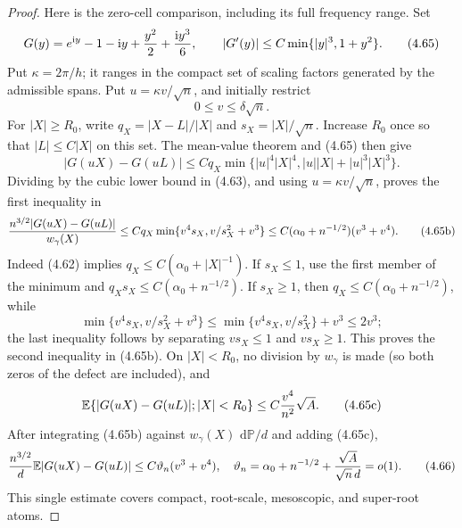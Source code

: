 \documentclass[11pt,a4paper]{article}
\numberwithin{equation}{section}
\theoremstyle{definition}
\theoremstyle{remark}
\newcommand{\E}{\mathbb E}
\newcommand{\Pp}{\mathbb P}
\newcommand{\ii}{\mathrm i}
\newcommand{\dd}{\,\mathrm d}
\begin{document}
\begin{proof}
Here is the zero-cell comparison, including its full frequency range.
Set
\[
 G(y)=e^{\ii y}-1-\ii y+{y^2\over2}+{\ii y^3\over6},
 \qquad |G'(y)|\le C\min\{|y|^3,1+y^2\}.             \tag{4.65}
\]
Put $\kappa=2\pi/h$; it ranges in the compact set of scaling factors
generated by the admissible spans.  Put $u=\kappa v/\sqrt n$, and initially
restrict
\[
                         0\le v\le\delta\sqrt n.      \tag{4.65a}
\]
For $|X|\ge R_0$, write $q_X=|X-L|/|X|$ and
$s_X=|X|/\sqrt n$.  Increase $R_0$ once so that
$|L|\le C|X|$ on this set.  The mean-value theorem and (4.65) then give
\[
 |G(uX)-G(uL)|
 \le Cq_X\min\{|u|^4|X|^4, |u||X|+|u|^3|X|^3\}.
\]
Dividing by the cubic lower bound in (4.63), and using
$u=\kappa v/\sqrt n$, proves the first inequality in
\[
 {n^{3/2}|G(uX)-G(uL)|\over w_\gamma(X)}
 \le Cq_X\min\{v^4s_X,v/s_X^2+v^3\}
 \le C(\alpha_0+n^{-1/2})(v^3+v^4).                  \tag{4.65b}
\]
Indeed (4.62) implies
$q_X\le C(\alpha _0+|X|^{-1})$.  If $s_X\le1$, use the first member
of the minimum and
$q_Xs_X\le C(\alpha_0+n^{-1/2})$.  If $s_X\ge1$, then
$q_X\le C(\alpha_0+n^{-1/2})$, while
\[
 \min\{v^4s_X,v/s_X^2+v^3\}
 \le \min\{v^4s_X,v/s_X^2\}+v^3\le2v^3;
\]
the last inequality follows by separating $vs_X\le1$ and
$vs_X\ge1$.  This proves the second inequality in (4.65b).  On
$|X|<R_0$, no division by
$w_\gamma$ is made (so both zeros of the defect are included), and
\[
 \E\{|G(uX)-G(uL)|;|X|<R_0\}
 \le C{v^4\over n^2}\sqrt A.                         \tag{4.65c}
\]
After integrating (4.65b) against $w_\gamma(X)\,\dd\Pp/d$ and adding
(4.65c),
\[
 {n^{3/2}\over d}\E|G(uX)-G(uL)|
 \le C\vartheta_n(v^3+v^4),
 \quad
 \vartheta_n=\alpha_0+n^{-1/2}+{\sqrt A\over\sqrt n\,d}=o(1). \tag{4.66}
\]
This single estimate covers compact, root-scale, mesoscopic, and
super-root atoms.


\end{proof}
\end{document}
